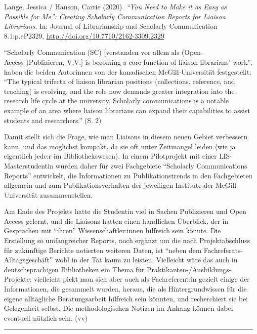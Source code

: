 \documentclass[a4paper,
fontsize=11pt,
oneside,
numbers=noperiodatend,
parskip=half-,
bibliography=totoc,
final
]{scrartcl}
\begin{document}
Lange, Jessica / Hanson, Carrie (2020). \emph{\enquote{You Need to Make
it as Easy as Possible for Me}: Creating Scholarly Communication Reports
for Liaison Librarians.} In: Journal of Librarianship and Scholarly
Communication 8.1:p.eP2329, \url{http://doi.org/10.7710/2162-3309.2329}

\enquote{Scholarly Communication (SC) {[}verstanden vor allem als
(Open-Access-)Publizieren, V.V.{]} is becoming a core function of
liaison librarians' work}, haben die beiden Autorinnen von der
kanadischen McGill-Universität festgestellt: \enquote{The typical
trifecta of liaison librarian positions (collections, reference, and
teaching) is evolving, and the role now demands greater integration into
the research life cycle at the university. Scholarly communications is a
notable example of an area where liaison librarians can expand their
capabilities to assist students and researchers.} (S. 2)

Damit stellt sich die Frage, wie man Liaisons in diesem neuen Gebiet
verbessern kann, und das möglichst kompakt, da sie oft unter Zeitmangel
leiden (wie ja eigentlich jede:r im Bibliothekswesen). In einem
Pilotprojekt mit einer LIS-Masterstudentin wurden daher für zwei
Fachgebiete \enquote{Scholarly Communications Reports} entwickelt, die
Informationen zu Publikationstrends in den Fachgebieten allgemein und
zum Publikationsverhalten der jeweiligen Institute der
McGill-Universität zusammenstellen.

Am Ende des Projekts hatte die Studentin viel in Sachen Publizieren und
Open Access gelernt, und die Liaisons hatten einen handlichen Überblick,
der in Gesprächen mit \enquote{ihren} Wissenschaftler:innen hilfreich
sein könnte. Die Erstellung so umfangreicher Reports, noch ergänzt um
die nach Projektabschluss für zukünftige Berichte notierten weiteren
Daten, ist \enquote{neben dem Fachreferats-Alltagsgeschäft} wohl in der
Tat kaum zu leisten. Vielleicht wäre das auch in deutschsprachigen
Bibliotheken ein Thema für Praktikanten-/Ausbildungs-Projekte;
vielleicht pickt man sich aber auch als Fachreferent:in gezielt einige
der Informationen, die gesammelt wurden, heraus, die als
Hintergrundwissen für die eigene alltägliche Beratungsarbeit hilfreich
sein könnten, und recherchiert sie bei Gelegenheit selbst. Die
methodologischen Notizen im Anhang können dabei eventuell nützlich sein.
(vv)

\begin{center}\rule{0.5\linewidth}{0.5pt}\end{center}
\end{document}
